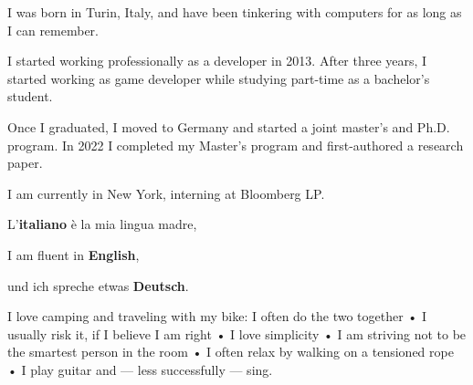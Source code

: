 


I was born in Turin, Italy, and have been tinkering with computers for as long as
I can remember. 

I started working professionally as a developer in 2013. After three years, I started working as game developer while studying part-time as a bachelor's student.

Once I graduated, I moved to Germany and started a joint master's and Ph.D. program. In 2022 I completed my Master's program and first-authored a research paper. 

I am currently in New York, interning at Bloomberg LP. 


L'\textbf{italiano} è la mia lingua madre,

I am fluent in \textbf{English},

und ich spreche etwas \textbf{Deutsch}.


I love camping and traveling with my bike: I often do the two together • I usually risk it, if I believe I am right • I love simplicity • I am striving not to be the smartest person in the room • I often relax by walking on a tensioned rope • I play guitar and --- less successfully --- sing.